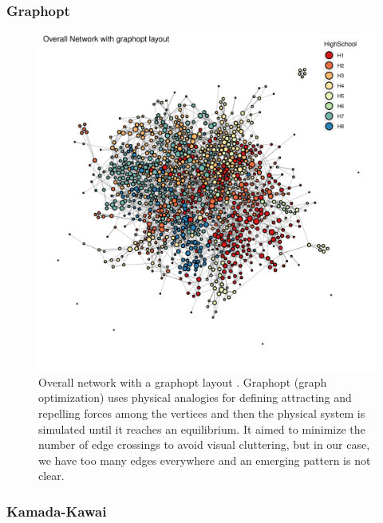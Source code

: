     \newpage

\subsubsection{Graphopt}

    \begin{figure}[h!]
        \centering
            \includegraphics[width=0.7\linewidth]{figures/Networks/Layouts/Graph_OverallNetwork_with_no_highlight_graphopt_HighSchool___graphopt.png} 
        \caption{Overall network with a graphopt layout \cite{gabor2023}. Graphopt (graph optimization) uses physical analogies for defining attracting and repelling forces among the vertices and then the physical system is simulated until it reaches an equilibrium. It aimed to minimize the number of edge crossings to avoid visual cluttering, but in our case, we have too many edges everywhere and an emerging pattern is not clear.}
        \label{figure:networksLayoutsGRAPHOPT}
    \end{figure}

    \newpage

\subsubsection{Kamada-Kawai}

